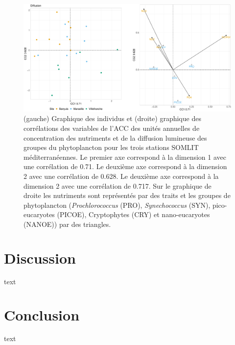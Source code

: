 \documentclass[12pt]{article}
\begin{document}
\begin{figure}
\centering
\includegraphics[width=.95\textwidth]{fig/R232_CCA_diff.pdf}
\caption{(gauche) Graphique des individus et (droite) graphique des corrélations des variables de l'ACC des unités annuelles de concentration des nutriments et de la diffusion lumineuse des groupes du phytoplancton pour les trois stations SOMLIT méditerranéennes. Le premier axe correspond à la dimension 1 avec une corrélation de 0.71. Le deuxième axe correspond à la dimension 2 avec une corrélation de 0.628. Le deuxième axe correspond à la dimension 2 avec une corrélation de 0.717. Sur le graphique de droite les nutriments sont représentés par des traits et les groupes de phytoplancton (\textit{Prochlorococcus} (PRO), \textit{Synechococcus} (SYN), pico-eucaryotes (PICOE), Cryptophytes (CRY) et nano-eucaryotes (NANOE)) par des triangles.}
\label{cca_diff}
\end{figure}

\section{Discussion}

text


\section{Conclusion}

text


\begin{singlespace}

\end{singlespace}

\newpage
{}
\listoffigures

\listoftables
\end{document}

